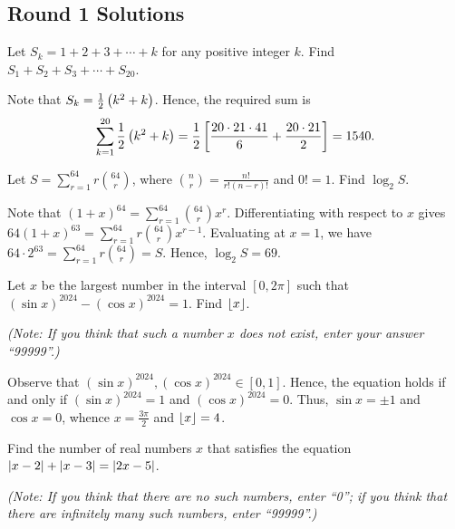 \subsection{Round 1 Solutions}\label{S::2024-O-1}


\begin{question}[1540]\label{A::2024-O-1-1}
    Let $S_k = 1 + 2 + 3 + \cdots + k$ for any positive integer $k$. Find $S_1 + S_2 + S_3 + \cdots + S_{20}$.
\end{question}

Note that $S_k = \frac12 \left( k^2 + k \right)$. Hence, the required sum is \[\sum_{k= 1}^{20} \frac12 \left( k^2 + k \right) = \frac12 \left[ \frac{20 \cdot 21 \cdot 41}{6} + \frac{20 \cdot 21}{2} \right] = 1540.\]

\begin{question}[69]\label{A::2024-O-1-2}
    Let $S = \sum_{r=1}^{64} r\binom{64}{r}$, where $\binom{n}{r} = \frac{n!}{r! (n-r)!}$ and $0! = 1$. Find $\log_2 S$.
\end{question}

Note that $(1 + x)^{64} = \sum_{r = 1}^{64} \binom{64}{r} x^{r}$. Differentiating with respect to $x$ gives $64 (1 + x)^{63} = \sum_{r = 1}^{64} r\binom{64}{r} x^{r-1}$. Evaluating at $x = 1$, we have $64 \cdot 2^{63} = \sum_{r = 1}^{64} r \binom{64}{r} = S$. Hence, $\log_2 S = 69$.

\begin{question}[4]\label{A::2024-O-1-3}
    Let $x$ be the largest number in the interval $[0, 2\pi]$ such that $(\sin x)^{2024} - (\cos x)^{2024} = 1$. Find $\left\lfloor x \right\rfloor$.

    \noindent\textit{(Note: If you think that such a number $x$ does not exist, enter your answer ``99999''.)}
\end{question}

Observe that $(\sin x)^{2024}, (\cos x)^{2024} \in [0, 1]$. Hence, the equation holds if and only if $(\sin x)^{2024} = 1$ and $(\cos x)^{2024} = 0$. Thus, $\sin x = \pm 1$ and $\cos x = 0$, whence $x = \frac{3\pi}{2}$ and $\left\lfloor x \right\rfloor = 4$.

\begin{question}[99999]\label{A::2024-O-1-4}
    Find the number of real numbers $x$ that satisfies the equation $\left\lvert x - 2 \right\rvert + \left\lvert x - 3 \right\rvert = \left\lvert 2x - 5 \right\rvert$.

    \noindent\textit{(Note: If you think that there are no such numbers, enter ``0''; if you think that there are infinitely many such numbers, enter ``99999''.)}
\end{question}

